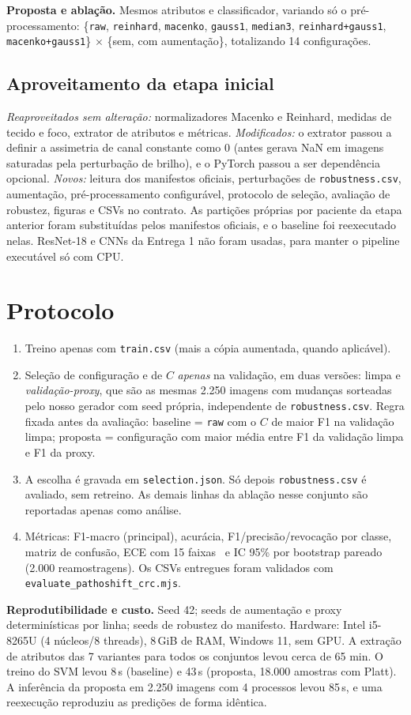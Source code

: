 \documentclass[10pt,conference]{IEEEtran}
\newcommand{\cfg}[1]{\texttt{#1}}
\begin{document}
\textbf{Proposta e ablação.} Mesmos atributos e classificador, variando só o pré-processamento: \{\cfg{raw}, \cfg{reinhard}, \cfg{macenko}, \cfg{gauss1}, \cfg{median3}, \cfg{reinhard+gauss1}, \cfg{macenko+gauss1}\} $\times$ \{sem, com aumentação\}, totalizando 14 configurações.

\subsection{Aproveitamento da etapa inicial}
\emph{Reaproveitados sem alteração:} normalizadores Macenko e Reinhard, medidas de tecido e foco, extrator de atributos e métricas. \emph{Modificados:} o extrator passou a definir a assimetria de canal constante como 0 (antes gerava NaN em imagens saturadas pela perturbação de brilho), e o PyTorch passou a ser dependência opcional. \emph{Novos:} leitura dos manifestos oficiais, perturbações de \cfg{robustness.csv}, aumentação, pré-processamento configurável, protocolo de seleção, avaliação de robustez, figuras e CSVs no contrato. As partições próprias por paciente da etapa anterior foram substituídas pelos manifestos oficiais, e o baseline foi reexecutado nelas. ResNet-18 e CNNs da Entrega 1 não foram usadas, para manter o pipeline executável só com CPU.

\section{Protocolo}
\begin{enumerate}
\item Treino apenas com \cfg{train.csv} (mais a cópia aumentada, quando aplicável).
\item Seleção de configuração e de $C$ \emph{apenas} na validação, em duas versões: limpa e \emph{validação-proxy}, que são as mesmas 2.250 imagens com mudanças sorteadas pelo nosso gerador com seed própria, independente de \cfg{robustness.csv}. Regra fixada antes da avaliação: baseline = \cfg{raw} com o $C$ de maior F1 na validação limpa; proposta = configuração com maior média entre F1 da validação limpa e F1 da proxy.
\item A escolha é gravada em \cfg{selection.json}. Só depois \cfg{robustness.csv} é avaliado, sem retreino. As demais linhas da ablação nesse conjunto são reportadas apenas como análise.
\item Métricas: F1-macro (principal), acurácia, F1/precisão/revocação por classe, matriz de confusão, ECE com 15 faixas~\cite{guo2017calibration} e IC 95\% por bootstrap pareado (2.000 reamostragens). Os CSVs entregues foram validados com \cfg{evaluate\_pathoshift\_crc.mjs}.
\end{enumerate}
\textbf{Reprodutibilidade e custo.} Seed 42; seeds de aumentação e proxy determinísticas por linha; seeds de robustez do manifesto. Hardware: Intel i5-8265U (4 núcleos/8 threads), 8\,GiB de RAM, Windows 11, sem GPU. A extração de atributos das 7 variantes para todos os conjuntos levou cerca de 65 min. O treino do SVM levou 8\,s (baseline) e 43\,s (proposta, 18.000 amostras com Platt). A inferência da proposta em 2.250 imagens com 4 processos levou 85\,s, e uma reexecução reproduziu as predições de forma idêntica.
\end{document}
